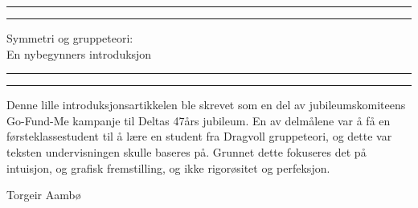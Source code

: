 
\begin{titlingpage}
    \vspace*{\fill}
    \rule[-11pt]{\textwidth}{1pt}
    \rule{\textwidth}{0.5pt}
    \begin{center}
    \Large Symmetri og gruppeteori:\\
    En nybegynners introduksjon
    \end{center}
    \rule{\textwidth}{0.5pt}
    \rule[10.1pt]{\textwidth}{1pt}

    Denne lille introduksjonsartikkelen ble skrevet som en del av jubileumskomiteens Go-Fund-Me kampanje til Deltas 47års jubileum. 
    En av delmålene var å få en førsteklassestudent til å lære en student fra Dragvoll gruppeteori, og dette var teksten undervisningen skulle baseres på.
    Grunnet dette fokuseres det på intuisjon, og grafisk fremstilling, og ikke rigorøsitet og perfeksjon. 
    \begin{center}
    Torgeir Aambø 
    \end{center}
    \vspace{\fill}
    \tableofcontents
    \vspace{\fill}
    
    
\end{titlingpage}